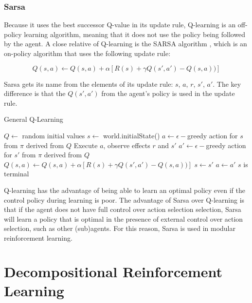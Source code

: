\subsubsection{Sarsa}

Because it uses the best successor Q-value in its update rule, Q-learning is an off-policy learning algorithm, meaning that it does not use the policy being followed by the agent. A close relative of Q-learning is the SARSA algorithm \cite{rummery1994online}, which is an on-policy algorithm that uses the following update rule:

\begin{equation}\label{eqn:sarsa-update}
Q(s, a) \leftarrow Q(s, a) + \alpha [R(s) + \gamma Q(s', a') - Q(s, a))]
\end{equation}

Sarsa gets its name from the elements of its update rule: $s$, $a$, $r$, $s'$, $a'$. The key difference is that the $Q(s', a')$ from the agent's policy is used in the update rule.

\begin{algorithm}
  \caption{General Q-Learning}\label{alg:sarsa}
  \begin{algorithmic}
    \State $Q \gets$ random initial values
      \State $s \gets$ world.initialState()
      \State $a \gets \epsilon-$greedy action for $s$ from $\pi$ derived from $Q$
      \Repeat
        \State Execute $a$, observe effects $r$ and $s'$
        \State $a' \gets \epsilon-$greedy action for $s'$ from $\pi$ derived from $Q$
        \State $Q(s, a) \gets Q(s, a) + \alpha [R(s) + \gamma Q(s', a') - Q(s, a))]$
        \State $s \gets s'$
        \State $a \gets a'$
      \Until $s$ is terminal
    \EndFor
  \end{algorithmic}
\end{algorithm}

Q-learning has the advantage of being able to learn an optimal policy even if the control policy during learning is poor. The advantage of Sarsa over Q-learning is that if the agent does not have full control over action selection selection, Sarsa will learn a policy that is optimal in the presence of external control over action selection, such as other (sub)agents. For this reason, Sarsa is used in modular reinforcement learning.

\section{Decompositional Reinforcement Learning}

